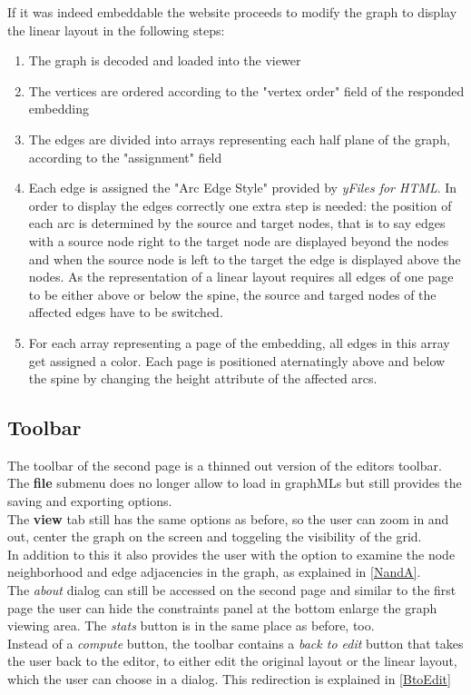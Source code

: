 \noindent If it was indeed embeddable the website proceeds to modify the graph to display the linear layout in the following steps:
\begin{enumerate}
\item The graph is decoded and loaded into the viewer
\item The vertices are ordered according to the "vertex order" field of the responded embedding
\item The edges are divided into arrays representing each half plane of the graph, according to the "assignment" field\\
\item Each edge is assigned the "Arc Edge Style" provided by \textit{yFiles for HTML}. In order to display the edges correctly one extra step is needed: the position of each arc is determined by the source and target nodes, that is to say edges with a source node right to the target node are displayed beyond the nodes and when the source node is left to the target the edge is displayed above the nodes. As the representation of a linear layout requires all edges of one page to be either above or below the spine, the source and targed nodes of the affected edges have to be switched.
\item For each array representing a page of the embedding, all edges in this array get assigned a color. Each page is positioned aternatingly above and below the spine by changing the height attribute of the affected arcs.\\
\end{enumerate}
\subsection{Toolbar}
The toolbar of the second page is a thinned out version of the editors toolbar.\\
The \textbf{file} submenu does no longer allow to load in graphMLs but still provides the saving and exporting options.\\[12pt]
The \textbf{view} tab still has the same options as before, so the user can zoom in and out, center the graph on the screen and toggeling the visibility of the grid.\\
In addition to this it also provides the user with the option to examine the node neighborhood and edge adjacencies in the graph, as explained in \autoref{NandA}.\\
The \textit{about} dialog can still be accessed on the second page and similar to the first page the user can hide the constraints panel at the bottom enlarge the graph viewing area. The \textit{stats} button is in the same place as before, too.\\
Instead of a \textit{compute} button, the toolbar contains a \textit{back to edit} button that takes the user back to the editor, to either edit the original layout or the linear layout, which the user can choose in a dialog. This redirection is explained in \autoref{BtoEdit}\\
